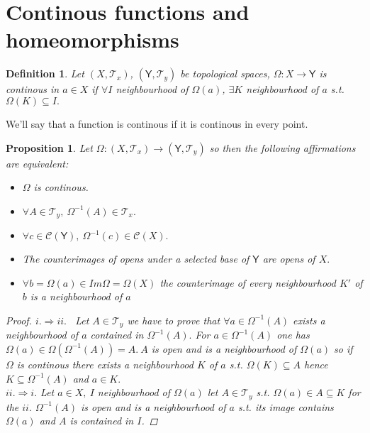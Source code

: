 \documentclass{article}
\newtheorem{proposition}{Proposition}
\newtheorem{definition}{Definition}
\begin{document}
    \section*{Continous functions and homeomorphisms}
    \begin{definition}
        Let $(X, \mathcal{T}_x)$, $(\mathsf{Y}, \mathcal{T}_y)$ be topological spaces, $\varOmega : X \rightarrow \mathsf{Y}$ is continous in $a\in X$ if $\forall I $ neighbourhood of $\varOmega(a)$, $\exists K$ neighbourhood of $a$ s.t. $\varOmega(K) \subseteq I.$  
    \end{definition}
    We'll say that a function is continous if it is continous in every point.
    \begin{proposition}
        Let $\varOmega:(X, \mathcal{T}_x) \rightarrow (\mathsf{Y}, \mathcal{T}_y)$ so then the following affirmations are equivalent:
        \begin{itemize}
            \item[i.] $\varOmega$ is continous.
            \item[ii.] $\forall A \in \mathcal{T}_y,\ \varOmega^{-1}(A) \in \mathcal{T}_x.$
            \item[iii.] $\forall c \in \mathcal{C}(\mathsf{Y}), \ \varOmega^{-1}(c) \in \mathcal{C}(X).$
            \item[iv.] The counterimages of opens under a selected base of $\mathsf{Y}$ are opens of $X.$
            \item[v.] $\forall b = \varOmega(a) \in Im\varOmega = \varOmega(X)$ the counterimage  of every neighbourhood $K'$ of $b$ is a neighbourhood of $a$      
        \end{itemize}
        \begin{proof}
            $i. \Rightarrow ii.$ \ Let $A \in \mathcal{T}_y$ we have to prove that $\forall a \in \varOmega^{-1}(A)$ exists a neighbourhood of $a$ contained in $\varOmega^{-1}(A).$ For $a \in \varOmega^{-1}(A)$ one has $\varOmega(a) \in \varOmega(\varOmega^{-1}(A)) = A.\ A$ is open and is a neighbourhood of $\varOmega(a)$ so if $\varOmega$ is continous there exists a neighbourhood $K$ of $a$ s.t. 
            $\varOmega(K) \subseteq A$ hence $K \subseteq \varOmega^{-1}(A)$ and $a \in K.$ \\
            $ii. \Rightarrow i.$ Let $a \in X, \ I$ neighbourhood of $\varOmega(a)$ let $A \in \mathcal{T}_y$ s.t. $\varOmega(a) \in A \subseteq K$ for the $ii.$ $\varOmega^{-1}(A)$ is open and is a neighbourhood of $a$ s.t. its image contains $\varOmega(a)$ and $A$ is contained in $I$.
        \end{proof}
    \end{proposition}
    
\end{document}
